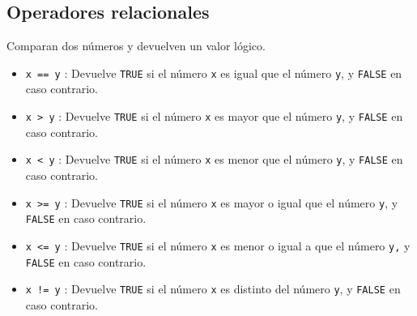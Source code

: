 \documentclass[
  a4paper,
]{scrreport}
\providecommand{\tightlist}{%
  \setlength{\itemsep}{0pt}\setlength{\parskip}{0pt}}\usepackage{longtable,booktabs,array}
\theoremstyle{definition}
\theoremstyle{definition}
\theoremstyle{remark}
\begin{document}
\hypertarget{operadores-relacionales}{%
\subsection{Operadores relacionales}\label{operadores-relacionales}}

Comparan dos números y devuelven un valor lógico.

\begin{itemize}
\tightlist
\item
  \texttt{x\ ==\ y} : Devuelve \texttt{TRUE} si el número \texttt{x} es
  igual que el número \texttt{y}, y \texttt{FALSE} en caso contrario.
\item
  \texttt{x\ \textgreater{}\ y} : Devuelve \texttt{TRUE} si el número
  \texttt{x} es mayor que el número \texttt{y}, y \texttt{FALSE} en caso
  contrario.
\item
  \texttt{x\ \textless{}\ y} : Devuelve \texttt{TRUE} si el número
  \texttt{x} es menor que el número \texttt{y}, y \texttt{FALSE} en caso
  contrario.
\item
  \texttt{x\ \textgreater{}=\ y} : Devuelve \texttt{TRUE} si el número
  \texttt{x} es mayor o igual que el número \texttt{y}, y \texttt{FALSE}
  en caso contrario.
\item
  \texttt{x\ \textless{}=\ y} : Devuelve \texttt{TRUE} si el número
  \texttt{x} es menor o igual a que el número \texttt{y,} y
  \texttt{FALSE} en caso contrario.
\item
  \texttt{x\ !=\ y} : Devuelve \texttt{TRUE} si el número \texttt{x} es
  distinto del número \texttt{y}, y \texttt{FALSE} en caso contrario.
\end{itemize}
\end{document}

